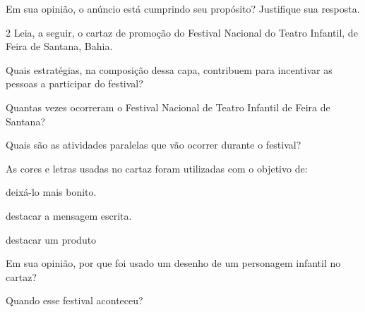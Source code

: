 \begin{escolha}
\begin{escolha}
\begin{escolha}

\item Em sua opinião, o anúncio está cumprindo seu propósito? Justifique sua resposta.

\end{escolha}

\num{2} Leia, a seguir, o cartaz de promoção do Festival Nacional do Teatro
Infantil, de Feira de Santana, Bahia.


\begin{escolha}
\item Quais estratégias, na composição dessa capa, contribuem para
incentivar as pessoas a participar do festival?


\item Quantas vezes ocorreram o Festival Nacional de Teatro Infantil de
Feira de Santana?


\item Quais são as atividades paralelas que vão ocorrer durante o festival?


\item As cores e letras usadas no cartaz foram utilizadas com o objetivo de:

\begin{boxlist}
\boxitem[] deixá-lo mais bonito.

\boxitem[\rosa{X}] destacar a mensagem escrita.

\boxitem[] destacar um produto
\end{boxlist}

\item Em sua opinião, por que foi usado um desenho de um personagem infantil no cartaz?


\item Quando esse festival aconteceu? 


\end{escolha}
\end{escolha}
\end{escolha}
